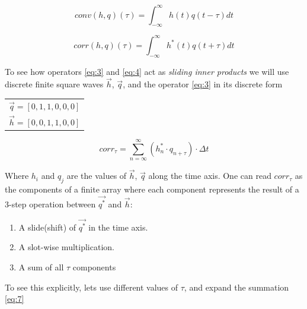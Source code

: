 \begin{equation}\label{eq:3}
conv(h, q)(\tau)= \int_{-\infty}^{\infty} h(t)q(t-\tau)dt
\end{equation}


\begin{equation}\label{eq:4}
corr(h, q)(\tau)= \int_{-\infty}^{\infty} h^*(t)q(t+\tau)dt
\end{equation}

To see how operators \ref{eq:3} and \ref{eq:4} act as \textit{sliding inner products} we will use discrete finite square waves $\vec{h}$, $\vec{q}$, and the operator \ref{eq:3} in its discrete form 


\vspace{0.5cm}

\begin{center}

\begin{tabular}{c}
$ \vec{q} = [0,1,1,0,0,0]$ \\
$ \vec{h} = [0,0,1,1,0,0]$

\end{tabular}

\end{center}

\vspace{0.5cm}

\begin{equation}\label{eq:7}
corr_{\tau} = \sum_{n=\infty}^{\infty} (h^*_{n} \cdot q_{n+\tau}) \cdot \Delta t
\end{equation}


Where $h_i$ and $q_j$  are the values of $\vec{h}$, $\vec{q}$ along the time axis. One can read $corr_\tau$ as the components of a finite array where each component represents  the result of a 3-step operation between $\vec{q^*}$ and $\vec{h}$:

\begin{enumerate}
\item A slide(shift) of $\vec{q^*}$ in the time axis.
\item A slot-wise multiplication.
\item A sum of all $\tau$ components
\end{enumerate}

To see this explicitly, lets use different values of $\tau$, and expand the summation \ref{eq:7} 

